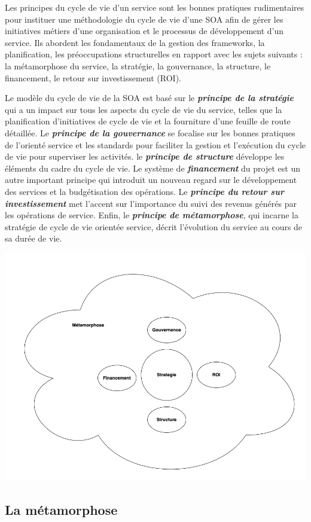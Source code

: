 \documentclass[
]{book}
\theoremstyle{definition}
\theoremstyle{definition}
\theoremstyle{definition}
\theoremstyle{definition}
\theoremstyle{remark}
\begin{document}
Les principes du cycle de vie d'un service sont les bonnes pratiques rudimentaires pour instituer une méthodologie du cycle de vie d'une SOA afin de gérer les initiatives métiers d'une organisation et le processus de développement d'un service. Ils abordent les fondamentaux de la gestion des frameworks, la planification, les préoccupations structurelles en rapport avec les sujets suivants :
la métamorphose du service, la stratégie, la gouvernance, la structure, le financement, le retour sur investissement (ROI).

Le modèle du cycle de vie de la SOA est basé sur le \textbf{\emph{principe de la stratégie}} qui a un impact sur tous les aspects du cycle de vie du service, telles que la planification d'initiatives de cycle de vie et la fourniture d'une feuille de route détaillée. Le \textbf{\emph{principe de la gouvernance}} se focalise sur les bonnes pratiques de l'orienté service et les standards pour faciliter la gestion et l'exécution du cycle de vie pour superviser les activités. le \textbf{\emph{principe de structure}} développe les éléments du cadre du cycle de vie. Le système de \textbf{\emph{financement}} du projet est un autre important principe qui introduit un nouveau regard sur le développement des services et la budgétisation des opérations. Le \textbf{\emph{principe du retour sur investissement}} met l'accent sur l'importance du suivi des revenus générés par les opérations de service. Enfin, le \textbf{\emph{principe de métamorphose}}, qui incarne la stratégie de cycle de vie orientée service, décrit l'évolution du service au cours de sa durée de vie.

\begin{center}\includegraphics[width=0.7\linewidth]{principes} \end{center}

\hypertarget{la-muxe9tamorphose}{%
\subsection*{La métamorphose}\label{la-muxe9tamorphose}}
\end{document}
